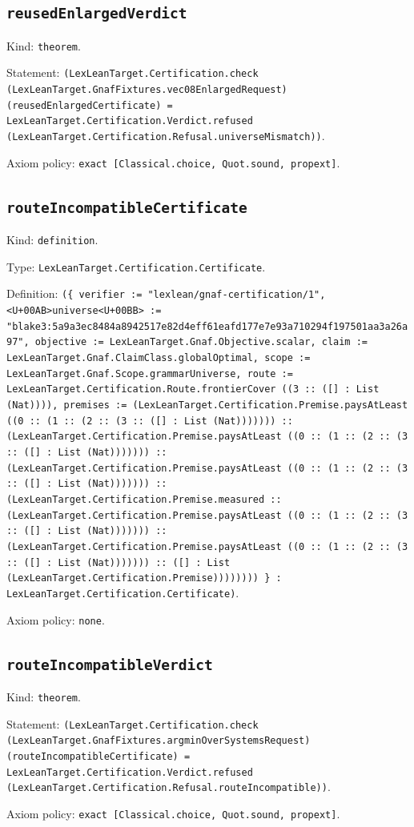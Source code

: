 \documentclass[11pt]{article}
\begin{document}
\subsection*{\texttt{reusedEnlargedVerdict}}
\noindent Kind: \texttt{theorem}.\par
\noindent Statement: \texttt{(LexLeanTarget.Certification.check (LexLeanTarget.GnafFixtures.vec08EnlargedRequest) (reusedEnlargedCertificate) = LexLeanTarget.Certification.Verdict.refused (LexLeanTarget.Certification.Refusal.universeMismatch))}.\par
\noindent Axiom policy: \texttt{exact [Classical.choice, Quot.sound, propext]}.\par
\subsection*{\texttt{routeIncompatibleCertificate}}
\noindent Kind: \texttt{definition}.\par
\noindent Type: \texttt{LexLeanTarget.Certification.Certificate}.\par
\noindent Definition: \texttt{(\{ verifier := "lexlean/gnaf-certification/1", <U+00AB>universe<U+00BB> := "blake3:5a9a3ec8484a8942517e82d4eff61eafd177e7e93a710294f197501aa3a26a97", objective := LexLeanTarget.Gnaf.Objective.scalar, claim := LexLeanTarget.Gnaf.ClaimClass.globalOptimal, scope := LexLeanTarget.Gnaf.Scope.grammarUniverse, route := LexLeanTarget.Certification.Route.frontierCover ((3 :: ([] : List (Nat)))), premises := (LexLeanTarget.Certification.Premise.paysAtLeast ((0 :: (1 :: (2 :: (3 :: ([] : List (Nat))))))) :: (LexLeanTarget.Certification.Premise.paysAtLeast ((0 :: (1 :: (2 :: (3 :: ([] : List (Nat))))))) :: (LexLeanTarget.Certification.Premise.paysAtLeast ((0 :: (1 :: (2 :: (3 :: ([] : List (Nat))))))) :: (LexLeanTarget.Certification.Premise.measured :: (LexLeanTarget.Certification.Premise.paysAtLeast ((0 :: (1 :: (2 :: (3 :: ([] : List (Nat))))))) :: (LexLeanTarget.Certification.Premise.paysAtLeast ((0 :: (1 :: (2 :: (3 :: ([] : List (Nat))))))) :: ([] : List (LexLeanTarget.Certification.Premise)))))))) \} : LexLeanTarget.Certification.Certificate)}.\par
\noindent Axiom policy: \texttt{none}.\par
\subsection*{\texttt{routeIncompatibleVerdict}}
\noindent Kind: \texttt{theorem}.\par
\noindent Statement: \texttt{(LexLeanTarget.Certification.check (LexLeanTarget.GnafFixtures.argminOverSystemsRequest) (routeIncompatibleCertificate) = LexLeanTarget.Certification.Verdict.refused (LexLeanTarget.Certification.Refusal.routeIncompatible))}.\par
\noindent Axiom policy: \texttt{exact [Classical.choice, Quot.sound, propext]}.\par
\end{document}
